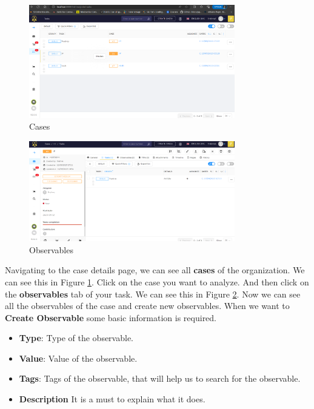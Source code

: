 \documentclass{article}
\begin{document}
\begin{figure}[H]
    \centering
    \includegraphics[width=0.8\textwidth]{cases.png}
    \caption{Cases}
    \label{fig:cases}
\end{figure}

\begin{figure}[H]
    \centering
    \includegraphics[width=0.8\textwidth]{observables.png}
    \caption{Observables}
    \label{fig:observables}
\end{figure}

Navigating to the case details page, we can see all \textbf{cases} of the organization.
We can see this in Figure \ref{fig:cases}.
Click on the case you want to analyze. And then click on the \textbf{observables} tab of your task.
We can see this in Figure \ref{fig:observables}. Now we can see all the observables of the case and create new observables.
When we want to \textbf{Create Observable} some basic information is required.
\begin{itemize}
    \item \textbf{Type}: Type of the observable.
    \item \textbf{Value}: Value of the observable.
    \item \textbf{Tags}: Tags of the observable, that will help us to search for the observable.
    \item \textbf{Description}
    It is a must to explain what it does.
\end{itemize}
\end{document}
